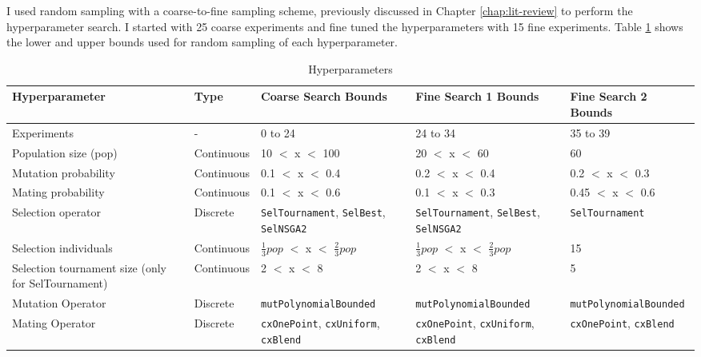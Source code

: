 I used random sampling with a coarse-to-fine sampling scheme, previously 
discussed in Chapter \ref{chap:lit-review} to perform the hyperparameter search. 
I started with 25 coarse experiments and fine tuned the hyperparameters
with 15 fine experiments. 
Table \ref{tab:hyperparameter_search} shows the lower and upper bounds used 
for random sampling of each hyperparameter. 
\begin{table}[]
    \centering
    \onehalfspacing
    \caption{Hyperparameters}
	\label{tab:hyperparameter_search}
    \footnotesize
    \begin{tabular}{p{4cm}lp{3.4cm}p{3.4cm}p{3.4cm}}
    \hline 
    \textbf{Hyperparameter}& \textbf{Type} & \textbf{Coarse Search Bounds} & \textbf{Fine Search 1 Bounds} & \textbf{Fine Search 2 Bounds} \\
    \hline
    Experiments & - & 0 to 24 & 24 to 34 & 35 to 39 \\ 
    \hline
    Population size (pop) & Continuous & 10 $<$ x $<$ 100 & 20 $<$ x $<$ 60 & 60 \\ 
    Mutation probability & Continuous & 0.1 $<$ x $<$ 0.4 & 0.2 $<$ x $<$ 0.4& 0.2 $<$ x $<$ 0.3\\
    Mating probability & Continuous & 0.1 $<$ x $<$ 0.6 &  0.1 $<$ x $<$ 0.3 &  0.45 $<$ x $<$ 0.6\\
    Selection operator & Discrete & \texttt{SelTournament}, \texttt{SelBest}, \texttt{SelNSGA2} & \texttt{SelTournament}, \texttt{SelBest}, \texttt{SelNSGA2}& \texttt{SelTournament}\\
    Selection individuals & Continuous & $\frac{1}{3}pop$ $<$ x $<$ $\frac{2}{3}pop$ & $\frac{1}{3}pop$ $<$ x $<$ $\frac{2}{3}pop$ & 15\\
    Selection tournament size (only for SelTournament) & Continuous & 2 $<$ x $<$ 8 &2 $<$ x $<$ 8&5\\
    Mutation Operator & Discrete & \texttt{mutPolynomialBounded} &\texttt{mutPolynomialBounded}&\texttt{mutPolynomialBounded}\\
    Mating Operator & Discrete& \texttt{cxOnePoint}, \texttt{cxUniform}, \texttt{cxBlend} &\texttt{cxOnePoint}, \texttt{cxUniform}, \texttt{cxBlend}&\texttt{cxOnePoint}, \texttt{cxBlend}\\ 
    \hline
    \end{tabular}
\end{table}

